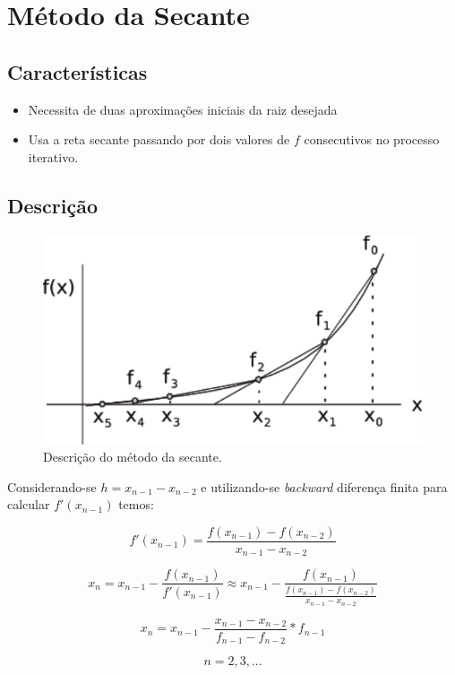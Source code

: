 \section{Método da Secante}

\subsection{Características}

\begin{itemize}
\item Necessita de duas aproximações iniciais da raiz desejada
\item Usa a reta secante passando por dois valores de $f$ consecutivos no processo iterativo.
\end{itemize}

\subsection{Descrição}

\begin{figure}[htb]
  \setlength{\abovecaptionskip}{20pt}
  \centering
  \includegraphics[scale=0.8]{capitulos/capitulo1/figuras/secante1-eps-converted-to.pdf}
  \caption{Descrição do método da secante.}
  \label{fig:secante1}
\end{figure}

Considerando-se $h = x_{n-1} - x_{n-2}$ e utilizando-se \textit{backward} diferença finita para calcular $f'(x_{n-1})$ temos:

\[
 f'(x_{n-1}) = \frac{f(x_{n-1}) - f(x_{n-2})}{x_{n-1} - x_{n-2}}
\]

\[
 x_{n} = x_{n-1} - \frac{f(x_{n-1})}{f'(x_{n-1})} \approx x_{n-1} - \frac{f(x_{n-1})}{\frac{\displaystyle f(x_{n-1}) - f(x_{n-2})}{\displaystyle x_{n-1} - x_{n-2}}}
\]

\[
x_{n} = x_{n-1} - \frac{x_{n-1} - x_{n-2}}{f_{n-1} - f_{n-2}} \ast f_{n-1}
\]

\[
 n = 2, 3, ...
\]